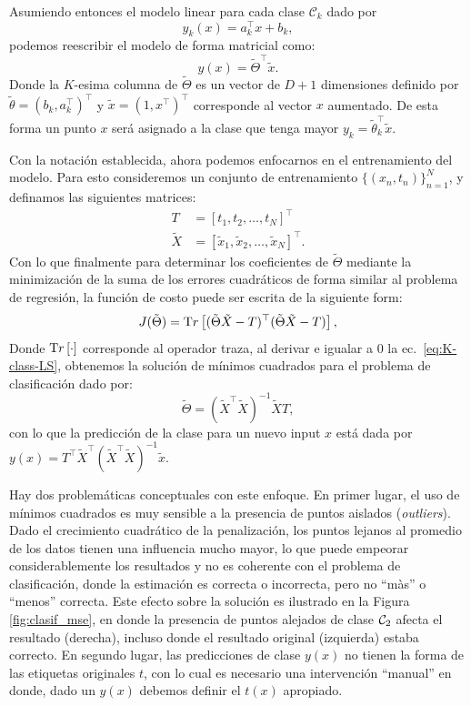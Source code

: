Asumiendo entonces el modelo linear para cada clase $\mathcal{C}_k$ dado por
\begin{equation}
	y_k(x) = a_k^\top x + b_k,
\end{equation}
podemos reescribir el modelo de forma matricial como:	
\begin{equation}
	y(x) = \tilde{\Theta}^\top \tilde{x}.
\end{equation}
Donde la $K$-esima columna de $\tilde{\Theta}$ es un vector de $D+1$ dimensiones definido por $\tilde{\theta}=(b_k, a_k^\top)^\top$ y $\tilde{x}=(1,x^\top)^\top$ corresponde al vector $x$ aumentado. De esta forma un punto $x$ será asignado a la clase que tenga mayor $y_k=\tilde{\theta}_k^\top \tilde{x}$.

Con la notación establecida, ahora podemos enfocarnos en el entrenamiento del modelo. Para esto consideremos un conjunto de entrenamiento $\{(x_n,t_n)\}_{n=1}^N$, y definamos las siguientes matrices:
\begin{align}
	T &= [t_1, t_2,\ldots, t_N]^\top\\
	\tilde{X} &= [\tilde{x}_1, \tilde{x}_2, \ldots, \tilde{x}_N ]^\top.
\end{align}
Con lo que finalmente para determinar los coeficientes de $\tilde{\Theta}$ mediante la minimización de la suma de los errores cuadráticos de forma similar al problema de regresión, la función de costo puede ser escrita de la siguiente form:
\begin{equation}
	J(\tilde{\Theta}) = \text Tr \left[(\tilde{\Theta}\tilde{X}-T)^\top(\tilde{\Theta}\tilde{X}-T)\right],\label{eq:K-class-LS}
\end{equation}
Donde $\text Tr \left[\cdot\right]$ corresponde al operador traza, al derivar e igualar a 0 la ec.~\eqref{eq:K-class-LS}, obtenemos la solución de mínimos cuadrados para el problema de clasificación dado por:
\begin{equation}
	\tilde{\Theta} = (\tilde{X}^\top\tilde{X})^{-1}\tilde{X}T,
\end{equation}
con lo que la predicción de la clase para un nuevo input $x$ está dada por $ y(x) = T^\top\tilde{X}^\top(\tilde{X}^\top\tilde{X})^{-1}\tilde{x}$.

\begin{remark} Hay dos problemáticas conceptuales con este enfoque. En primer lugar, el uso de mínimos cuadrados es muy sensible a la presencia de puntos aislados (\emph{outliers}). Dado el crecimiento cuadrático de la penalización, los puntos lejanos al promedio de los datos tienen una influencia mucho mayor, lo que puede empeorar considerablemente los resultados y no es coherente con el problema de clasificación, donde la estimación es correcta o incorrecta, pero no ``màs'' o ``menos'' correcta. Este efecto sobre la solución es ilustrado en la Figura \ref{fig:clasif_mse}, en donde la presencia de puntos alejados de clase ${\mathcal C}_2$ afecta el resultado (derecha), incluso donde el resultado original (izquierda) estaba correcto. En segundo lugar, las predicciones de  clase  $y(x)$ no tienen la forma de las etiquetas originales $t$, con lo cual es necesario una intervención ``manual'' en donde, dado un $y(x)$ debemos definir el $t(x)$ apropiado. 
\end{remark}


